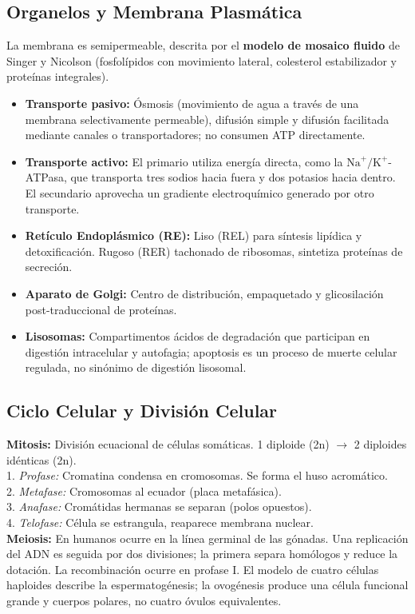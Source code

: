 \subsection{Organelos y Membrana Plasmática}
La membrana es semipermeable, descrita por el \textbf{modelo de mosaico fluido} de Singer y Nicolson (fosfolípidos con movimiento lateral, colesterol estabilizador y proteínas integrales).
\begin{itemize}
    \item \textbf{Transporte pasivo:} Ósmosis (movimiento de agua a través de una membrana selectivamente permeable), difusión simple y difusión facilitada mediante canales o transportadores; no consumen ATP directamente.
    \item \textbf{Transporte activo:} El primario utiliza energía directa, como la $\mathrm{Na}^{+}/\mathrm{K}^{+}$-ATPasa, que transporta tres sodios hacia fuera y dos potasios hacia dentro. El secundario aprovecha un gradiente electroquímico generado por otro transporte.
    \item \textbf{Retículo Endoplásmico (RE):} Liso (REL) para síntesis lipídica y detoxificación. Rugoso (RER) tachonado de ribosomas, sintetiza proteínas de secreción.
    \item \textbf{Aparato de Golgi:} Centro de distribución, empaquetado y glicosilación post-traduccional de proteínas.
    \item \textbf{Lisosomas:} Compartimentos ácidos de degradación que participan en digestión intracelular y autofagia; apoptosis es un proceso de muerte celular regulada, no sinónimo de digestión lisosomal.
\end{itemize}

\subsection{Ciclo Celular y División Celular}
\begin{tcolorbox}[colback=purple!5!white,colframe=purple!50!black,title=Fases de la Mitosis vs Meiosis]
\textbf{Mitosis:} División ecuacional de células somáticas. 1 diploide (2n) $\rightarrow$ 2 diploides idénticas (2n).\\
1. \textit{Profase:} Cromatina condensa en cromosomas. Se forma el huso acromático.\\
2. \textit{Metafase:} Cromosomas al ecuador (placa metafásica).\\
3. \textit{Anafase:} Cromátidas hermanas se separan (polos opuestos).\\
4. \textit{Telofase:} Célula se estrangula, reaparece membrana nuclear.\\
\textbf{Meiosis:} En humanos ocurre en la línea germinal de las gónadas. Una replicación del ADN es seguida por dos divisiones; la primera separa homólogos y reduce la dotación. La recombinación ocurre en profase I. El modelo de cuatro células haploides describe la espermatogénesis; la ovogénesis produce una célula funcional grande y cuerpos polares, no cuatro óvulos equivalentes.
\end{tcolorbox}

